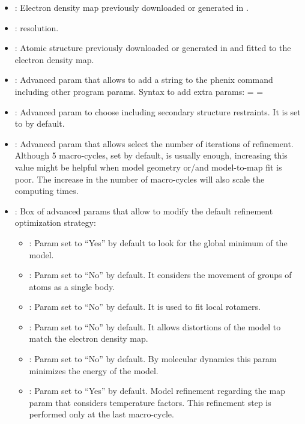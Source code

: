 \begin{itemize}
    \begin{itemize}
     \item {}: Electron density map previously downloaded or generated in \scipion.
     \item {}:  resolution.
     \item {}: Atomic structure previously downloaded or generated in \scipion and fitted to the electron density map.
     \item {}: Advanced param that allows to add a string to the phenix command including other  program params. Syntax to add extra params:  =   = 
     \item {}: Advanced param to choose including secondary structure restraints. It is set to  by default.
     \item {}: Advanced param that allows select the number of iterations of refinement. Although 5 macro-cycles, set by default, is usually enough, increasing this value might be helpful when model geometry or/and model-to-map fit is poor. The increase in the number of macro-cycles will also scale the computing times.
     \item {}: Box of advanced params that allow to modify the default refinement optimization strategy:
      \begin{itemize}
       \item {}: Param set to ``Yes'' by default to look for the global minimum of the model. 
       \item {}: Param set to ``No'' by default. It considers the movement of groups of atoms as a single body.
       \item {}: Param set to ``No'' by default. It is used to fit local rotamers.
       \item {}: Param set to ``No'' by default. It allows distortions of the model to match the electron density map.
       \item {}: Param set to ``No'' by default. By molecular dynamics this param minimizes the energy of the model.
       \item {}: Param set to ``Yes'' by default. Model refinement regarding the map param that considers temperature factors. This refinement step is performed only at the last macro-cycle.
      \end{itemize}
    \end{itemize}
 

\end{itemize}
